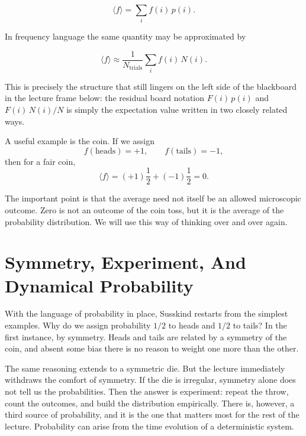 \begin{equation}
\langle f\rangle=\sum_i f(i)\,p(i).
\end{equation}

In frequency language the same quantity may be approximated by

\begin{equation}
\langle f\rangle \approx \frac{1}{N_{\text{trials}}}\sum_i f(i)\,N(i).
\end{equation}

This is precisely the structure that still lingers on the left side of the blackboard in the lecture frame below: the residual board notation \(F(i)\,p(i)\) and \(F(i)\,N(i)/N\) is simply the expectation value written in two closely related ways.

A useful example is the coin. If we assign
\begin{equation}
f(\text{heads})=+1,
\qquad
f(\text{tails})=-1,
\end{equation}
then for a fair coin,
\begin{equation}
\langle f\rangle = (+1)\frac12 + (-1)\frac12 = 0.
\end{equation}

The important point is that the average need not itself be an allowed microscopic outcome. Zero is not an outcome of the coin toss, but it is the average of the probability distribution. We will use this way of thinking over and over again.

\section{Symmetry, Experiment, And Dynamical Probability}

With the language of probability in place, Susskind restarts from the simplest examples. Why do we assign probability \(1/2\) to heads and \(1/2\) to tails? In the first instance, by symmetry. Heads and tails are related by a symmetry of the coin, and absent some bias there is no reason to weight one more than the other.

The same reasoning extends to a symmetric die. But the lecture immediately withdraws the comfort of symmetry. If the die is irregular, symmetry alone does not tell us the probabilities. Then the answer is experiment: repeat the throw, count the outcomes, and build the distribution empirically. There is, however, a third source of probability, and it is the one that matters most for the rest of the lecture. Probability can arise from the time evolution of a deterministic system.

